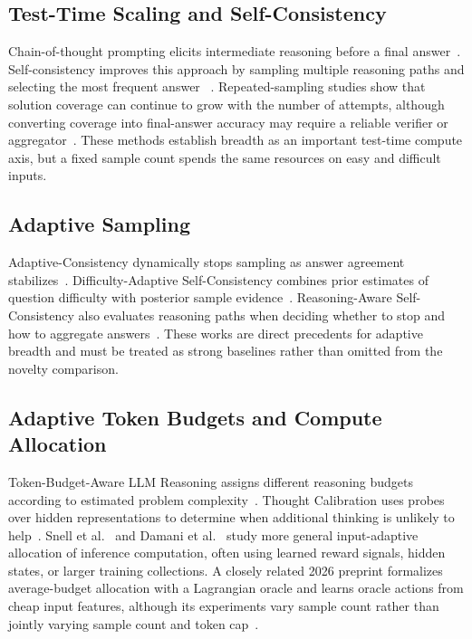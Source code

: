 \documentclass[runningheads]{llncs}
\begin{document}
\subsection{Test-Time Scaling and Self-Consistency}

Chain-of-thought prompting elicits intermediate reasoning before a final
answer~\cite{wei2022cot}. Self-consistency improves this approach by sampling
multiple reasoning paths and selecting the most frequent answer
~\cite{wang2023selfconsistency}. Repeated-sampling studies show that solution
coverage can continue to grow with the number of attempts, although converting
coverage into final-answer accuracy may require a reliable verifier or
aggregator~\cite{brown2024monkeys}. These methods establish breadth as an
important test-time compute axis, but a fixed sample count spends the same
resources on easy and difficult inputs.

\subsection{Adaptive Sampling}

Adaptive-Consistency dynamically stops sampling as answer agreement
stabilizes~\cite{aggarwal2023adaptive}. Difficulty-Adaptive Self-Consistency
combines prior estimates of question difficulty with posterior sample
evidence~\cite{wang2025penny}. Reasoning-Aware Self-Consistency also evaluates
reasoning paths when deciding whether to stop and how to aggregate
answers~\cite{wan2025rasc}. These works are direct precedents for adaptive
breadth and must be treated as strong baselines rather than omitted from the
novelty comparison.

\subsection{Adaptive Token Budgets and Compute Allocation}

Token-Budget-Aware LLM Reasoning assigns different reasoning budgets according
to estimated problem complexity~\cite{han2025token}. Thought Calibration uses
probes over hidden representations to determine when additional thinking is
unlikely to help~\cite{wu2025thought}. Snell et al.~\cite{snell2025scaling} and
Damani et al.~\cite{damani2025hard} study more general input-adaptive
allocation of inference computation, often using learned reward signals,
hidden states, or larger training collections. A closely related 2026 preprint
formalizes average-budget allocation with a Lagrangian oracle and learns oracle
actions from cheap input features, although its experiments vary sample count
rather than jointly varying sample count and token cap~\cite{zhai2026adaptive}.
\end{document}
